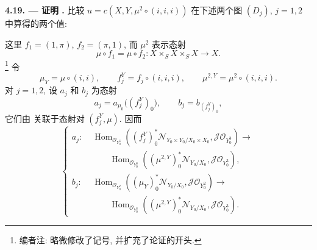 \medskip
\noindent{}\textbf{4.19. --- 证明 .}
比较 \(u=c(X,Y,\mu^2\circ(i,i,i))\)
在下述两个图 \((D_j)\), \(j=1,2\) 中算得的两个值:

\begin{center}
\end{center}

这里 \(f_1=(1,\pi)\), \(f_2=(\pi,1)\), 而 \(\mu^2\) 表示态射
\[
 \mu\circ f_1=\mu\circ f_2:
 X\mathbin{\times_S}X\mathbin{\times_S}X\longrightarrow X.
\]
\footnote{编者注: 略微修改了记号, 并扩充了论证的开头.}
令
\[
 \mu_Y=\mu\circ(i,i),\qquad
 f_j^Y=f_j\circ(i,i,i),\qquad
 \mu^{2,Y}=\mu^2\circ(i,i,i).
\]
对 \(j=1,2\), 设 \(a_j\) 和 \(b_j\) 为态射
\[
 a_j=a_{\mu_0}\bigl((f_j^Y)_0\bigr),
 \qquad
 b_j=b_{(f_j^Y)_0},
\]
它们由 关联于态射对
\((f_j^Y,\mu)\). 因而
\begin{equation}
\tag{\(\dagger\)}\label{sga3:iii:paragraph:4-19:equation:dagger}
\left\{
\begin{aligned}
 a_j:\;&
 \operatorname{Hom}_{\mathscr O_{Y_0^3}}
 \left((f_j^Y)_0^*
  \mathscr N_{Y_0\times Y_0/X_0\times X_0},
  \mathscr J\mathscr O_{Y_0^3}\right)
 \longrightarrow\\[-0.15em]
 &\qquad
 \operatorname{Hom}_{\mathscr O_{Y_0^3}}
 \left((\mu^{2,Y})_0^*\mathscr N_{Y_0/X_0},
  \mathscr J\mathscr O_{Y_0^3}\right),\\[0.35em]
 b_j:\;&
 \operatorname{Hom}_{\mathscr O_{Y_0^2}}
 \left((\mu_Y)_0^*\mathscr N_{Y_0/X_0},
  \mathscr J\mathscr O_{Y_0^2}\right)
 \longrightarrow\\[-0.15em]
 &\qquad
 \operatorname{Hom}_{\mathscr O_{Y_0^3}}
 \left((\mu^{2,Y})_0^*\mathscr N_{Y_0/X_0},
  \mathscr J\mathscr O_{Y_0^3}\right).
\end{aligned}
\right.
\end{equation}


